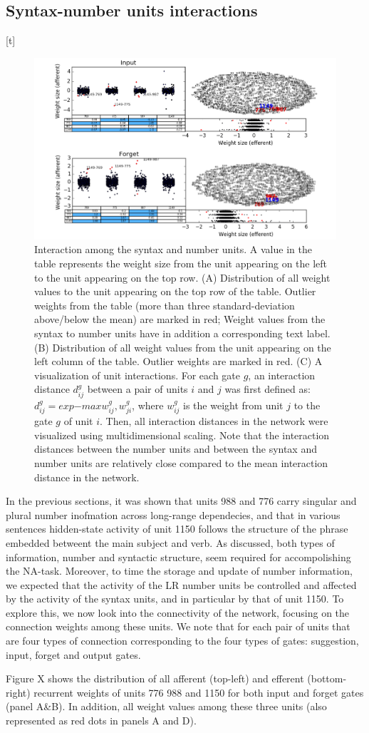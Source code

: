 \subsection{Syntax-number units interactions}[t]
\begin{figure}
\centering
\includegraphics[width=\textwidth]{Figures/Figure7_interactions.png}
\caption{Interaction among the syntax and number units. A value in the table represents the weight size from the unit appearing on the left to the unit appearing on the top row. (A) Distribution of all weight values to the unit appearing on the top row of the table. Outlier weights from the table (more than three standard-deviation above/below the mean) are marked in red; Weight values from the syntax to number units have in addition a corresponding text label. (B) Distribution of all weight values from the unit appearing on the left column of the table. Outlier weights are marked in red. (C)  A visualization of unit interactions. For each gate $g$, an interaction distance $d_{ij}^g$ between a pair of units $i$ and $j$ was first defined as: $d_{ij}^g=exp{-max{w_{ij}^g, w_{ji}^g}}$, where $w_{ij}^g$ is the weight from unit $j$ to the gate $g$ of unit $i$. Then, all interaction distances in the network were visualized using multidimensional scaling. Note that the interaction distances between the number units and between the syntax and number units are relatively close compared to the mean interaction distance in the network.}
\end{figure}

In the previous sections, it was shown that units 988 and 776 carry singular and plural number inofmation across long-range dependecies, and that in various sentences hidden-state activity of unit 1150 follows the structure of the phrase embedded betweent the main subject and verb. As discussed, both types of information, number and syntactic structure, seem required for accompolishing the NA-task. Moreover, to time the storage and update of number information, we expected that the activity of the LR number units be controlled and affected by the activity of the syntax units, and in particular by that of unit 1150. To explore this, we now look into the connectivity of the network, focusing on the connection weights among these units. We note that for each pair of units that are four types of connection corresponding to the four types of gates: suggestion, input, forget and output gates.

Figure X shows the distribution of all afferent (top-left) and efferent (bottom-right) recurrent weights of units 776 988 and 1150 for both input and forget gates (panel A\&B). In addition, all weight values among these three units (also represented as red dots in panels A and D). 
